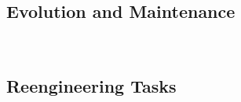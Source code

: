 
\subsection{Evolution and Maintenance}
\begin{frame}{\insertsubsection\ \mytitlesource{\ludewiglichter}}
	\slideEvolutionAndMaintenance
\end{frame}


\subsection{Reengineering Tasks}
